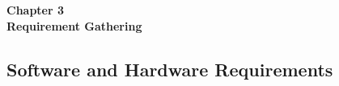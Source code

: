 
\titleformat{\chapter}[block]{\normalfont}{}{0pt}{}
\titlespacing{\chapter}{0pt}{-2em}{0pt}
\chapter[Requirement Gathering]{}
\thispagestyle{fancy}

\vspace*{\fill}
\begin{center}
\textbf{\Huge{Chapter 3}}\\
\vspace{5mm}
\textbf{\Huge{Requirement Gathering}}
\end{center}
\vspace*{\fill}
\newpage

\titleformat{\chapter}[display]{\vspace{1cm}\normalfont\Large\bfseries\centering}{\chaptertitlename\ \thechapter}{20pt}{\vspace{0pt}}
\titlespacing*{\chapter}{0pt}{-50pt}{20pt}

\section{Software and Hardware Requirements}

\justify

